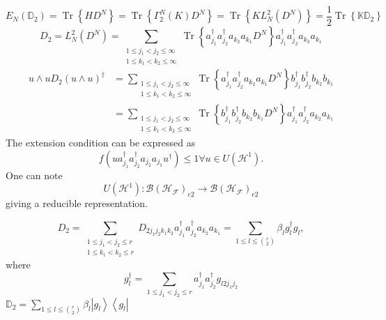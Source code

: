 \documentclass[aps,preprint]{revtex4}%
\begin{document}
\begin{equation}
E_{N}\left(  \mathbb{D}_{2}\right)  =\operatorname{Tr}\left\{  HD^{N}\right\}
=\operatorname{Tr}\left\{  \Gamma_{2}^{N}\left(  K\right)  D^{N}\right\}
=\operatorname{Tr}\left\{  KL_{N}^{2}\left(  D^{N}\right)  \right\}  =\frac
{1}{2}\operatorname{Tr}\left\{  \mathbb{KD}_{2}\right\}
\end{equation}%
\begin{equation}
D_{2}=L_{N}^{2}\left(  D^{N}\right)  =\sum_{\substack{1\leq j_{1}<j_{2}%
\leq\infty\\1\leq k_{1}<k_{2}\leq\infty}}\operatorname{Tr}\left\{  a_{j_{1}%
}^{\dagger}a_{j_{2}}^{\dagger}a_{k_{2}}a_{k_{1}}D^{N}\right\}  a_{j_{1}%
}^{\dagger}a_{j_{2}}^{\dagger}a_{k_{2}}a_{k_{1}}%
\end{equation}%
\begin{align}
u\wedge uD_{2}\left(  u\wedge u\right)  ^{\dagger}  &  =\sum_{\substack{1\leq
j_{1}<j_{2}\leq\infty\\1\leq k_{1}<k_{2}\leq\infty}}\operatorname{Tr}\left\{
a_{j_{1}}^{\dagger}a_{j_{2}}^{\dagger}a_{k_{2}}a_{k_{1}}D^{N}\right\}
b_{j_{1}}^{\dagger}b_{j_{2}}^{\dagger}b_{k_{2}}b_{k_{1}}\nonumber\\
&  =\sum_{\substack{1\leq j_{1}<j_{2}\leq\infty\\1\leq k_{1}<k_{2}\leq\infty
}}\operatorname{Tr}\left\{  b_{j_{1}}^{\dagger}b_{j_{2}}^{\dagger}b_{k_{2}%
}b_{k_{1}}D^{N}\right\}  a_{j_{1}}^{\dagger}a_{j_{2}}^{\dagger}a_{k_{2}%
}a_{k_{1}}%
\end{align}
The extension condition can be expressed as
\begin{equation}
f\left(  ua_{j_{1}}^{\dagger}a_{j_{2}}^{\dagger}a_{j_{2}}a_{j_{1}}u^{\dagger
}\right)  \leq1\forall u\in U\left(  \mathcal{H}^{1}\right)  .
\end{equation}
One can note
\begin{equation}
U\left(  \mathcal{H}^{1}\right)  :\mathcal{B}\left(  \mathcal{H}_{\mathcal{F}%
}\right)  _{e2}\rightarrow\mathcal{B}\left(  \mathcal{H}_{\mathcal{F}}\right)
_{e2}%
\end{equation}
giving a reducible representation.%

\begin{equation}
D_{2}=\sum_{\substack{1\leq j_{1}<j_{2}\leq r\\1\leq k_{1}<k_{2}\leq
r}}D_{2j_{1}j_{2}k_{1}k_{2}}a_{j_{1}}^{\dagger}a_{j_{2}}^{\dagger}a_{k_{2}%
}a_{k_{1}}=\sum_{1\leq l\leq\binom{r}{2}}\beta_{l}g_{l}^{\dagger}g_{l},
\end{equation}
where%
\begin{equation}
g_{l}^{\dagger}=\sum_{1\leq j_{1}<j_{2}\leq r}a_{j_{1}}^{\dagger}a_{j_{2}%
}^{\dagger}g_{l2j_{1}j_{2}}%
\end{equation}
$\mathbb{D}_{2}=\sum_{1\leq l\leq\binom{r}{2}}\beta_{l}\left\vert
g_{l}\right\rangle \left\langle g_{l}\right\vert $
\end{document}

